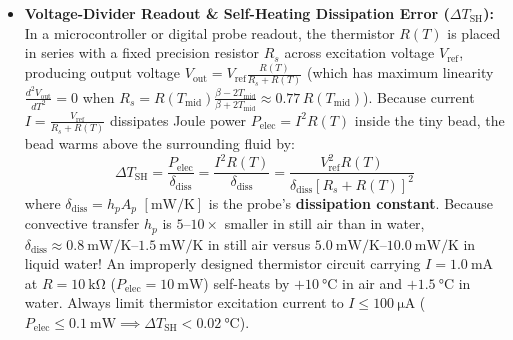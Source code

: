 \begin{itemize}
  \item \textbf{Voltage-Divider Readout \& Self-Heating Dissipation Error ($\Delta T_{\mathrm{SH}}$):}  In a microcontroller or digital probe readout, the thermistor $R(T)$ is placed in series with a fixed precision resistor $R_s$ across excitation voltage $V_{\mathrm{ref}}$, producing output voltage $V_{\mathrm{out}} = V_{\mathrm{ref}}\frac{R(T)}{R_s + R(T)}$ (which has maximum linearity $\frac{d^2 V_{\mathrm{out}}}{dT^2} = 0$ when $R_s = R(T_{\mathrm{mid}})\frac{\beta - 2T_{\mathrm{mid}}}{\beta + 2T_{\mathrm{mid}}} \approx 0.77\,R(T_{\mathrm{mid}})$). Because current $I = \frac{V_{\mathrm{ref}}}{R_s + R(T)}$ dissipates Joule power $P_{\mathrm{elec}} = I^2 R(T)$ inside the tiny bead, the bead warms above the surrounding fluid by:
  \begin{equation}\label{eq:17:selfheat}
    \Delta T_{\mathrm{SH}} = \frac{P_{\mathrm{elec}}}{\delta_{\mathrm{diss}}} = \frac{I^2 R(T)}{\delta_{\mathrm{diss}}} = \frac{V_{\mathrm{ref}}^2 R(T)}{\delta_{\mathrm{diss}}\left[R_s + R(T)\right]^2}
  \end{equation}
  where $\delta_{\mathrm{diss}} = h_p A_p$ $[\si{\milli\watt\per\kelvin}]$ is the probe's \textbf{dissipation constant}. Because convective transfer $h_p$ is $5\text{--}10\times$ smaller in still air than in water, $\delta_{\mathrm{diss}} \approx \SIrange{0.8}{1.5}{\milli\watt\per\kelvin}$ in still air versus $\SIrange{5.0}{10.0}{\milli\watt\per\kelvin}$ in liquid water! An improperly designed thermistor circuit carrying $I = \SI{1.0}{\milli\ampere}$ at $R = \SI{10}{\kilo\ohm}$ ($P_{\mathrm{elec}} = \SI{10}{\milli\watt}$) self-heats by $+\SI{10}{\celsius}$ in air and $+\SI{1.5}{\celsius}$ in water. Always limit thermistor excitation current to $I \le \SI{100}{\micro\ampere}$ ($P_{\mathrm{elec}} \le \SI{0.1}{\milli\watt} \implies \Delta T_{\mathrm{SH}} < \SI{0.02}{\celsius}$).
\end{itemize}

